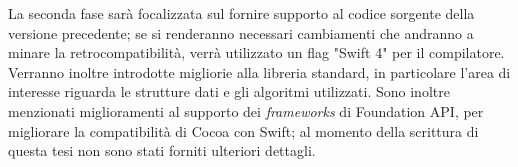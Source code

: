 La seconda fase sarà focalizzata sul fornire supporto al codice sorgente della versione precedente; se si renderanno necessari cambiamenti che andranno a minare la retrocompatibilità, verrà utilizzato un flag "Swift 4" per il compilatore.\\Verranno inoltre introdotte migliorie alla libreria standard, in particolare l'area di interesse riguarda le strutture dati e gli algoritmi utilizzati. Sono inoltre menzionati miglioramenti al supporto dei \textit{frameworks} di Foundation API, per migliorare la compatibilità di Cocoa con Swift; al momento della scrittura di questa tesi non sono stati forniti ulteriori dettagli.
 
